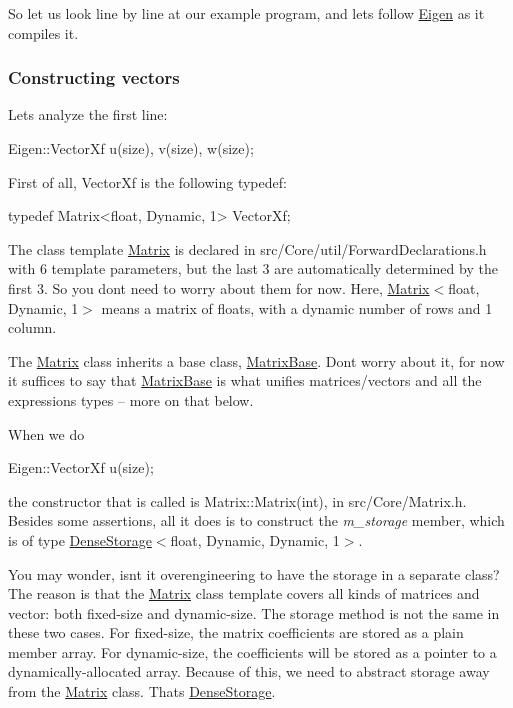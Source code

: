 So let us look line by line at our example program, and let\textquotesingle{}s follow \hyperlink{namespace_eigen}{Eigen} as it compiles it.\hypertarget{_topic_inside_eigen_example_ConstructingVectors}{}\subsubsection{Constructing vectors}\label{_topic_inside_eigen_example_ConstructingVectors}
Let\textquotesingle{}s analyze the first line\+:


\begin{DoxyCode}
Eigen::VectorXf u(size), v(size), w(size);
\end{DoxyCode}


First of all, Vector\+Xf is the following typedef\+: 
\begin{DoxyCode}
\textcolor{keyword}{typedef} Matrix<float, Dynamic, 1> VectorXf;
\end{DoxyCode}


The class template \hyperlink{group___core___module_class_eigen_1_1_matrix}{Matrix} is declared in src/\+Core/util/\+Forward\+Declarations.\+h with 6 template parameters, but the last 3 are automatically determined by the first 3. So you don\textquotesingle{}t need to worry about them for now. Here, \hyperlink{group___core___module_class_eigen_1_1_matrix}{Matrix}$<$float, Dynamic, 1$>$ means a matrix of floats, with a dynamic number of rows and 1 column.

The \hyperlink{group___core___module_class_eigen_1_1_matrix}{Matrix} class inherits a base class, \hyperlink{group___core___module_class_eigen_1_1_matrix_base}{Matrix\+Base}. Don\textquotesingle{}t worry about it, for now it suffices to say that \hyperlink{group___core___module_class_eigen_1_1_matrix_base}{Matrix\+Base} is what unifies matrices/vectors and all the expressions types -- more on that below.

When we do 
\begin{DoxyCode}
Eigen::VectorXf u(size);
\end{DoxyCode}
 the constructor that is called is Matrix\+::\+Matrix(int), in src/\+Core/\+Matrix.\+h. Besides some assertions, all it does is to construct the {\itshape m\+\_\+storage} member, which is of type \hyperlink{class_eigen_1_1_dense_storage}{Dense\+Storage}$<$float, Dynamic, Dynamic, 1$>$.

You may wonder, isn\textquotesingle{}t it overengineering to have the storage in a separate class? The reason is that the \hyperlink{group___core___module_class_eigen_1_1_matrix}{Matrix} class template covers all kinds of matrices and vector\+: both fixed-\/size and dynamic-\/size. The storage method is not the same in these two cases. For fixed-\/size, the matrix coefficients are stored as a plain member array. For dynamic-\/size, the coefficients will be stored as a pointer to a dynamically-\/allocated array. Because of this, we need to abstract storage away from the \hyperlink{group___core___module_class_eigen_1_1_matrix}{Matrix} class. That\textquotesingle{}s \hyperlink{class_eigen_1_1_dense_storage}{Dense\+Storage}.

